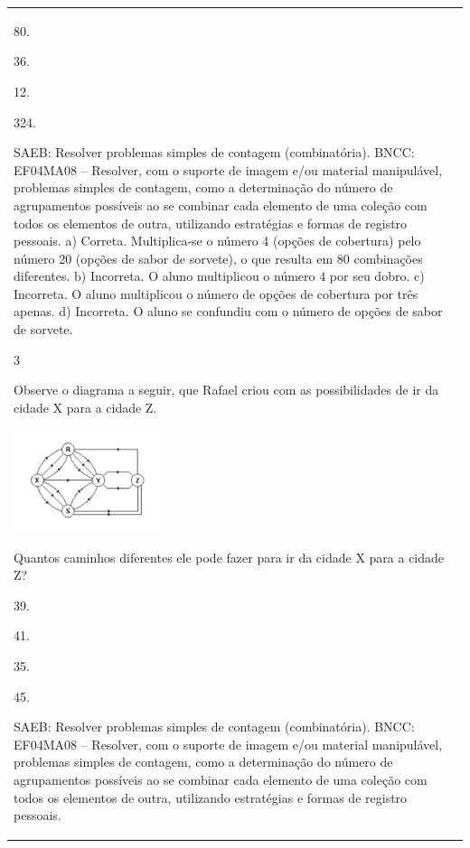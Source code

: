 \begin{mdframed}[linewidth=2pt,linecolor=salmao,roundcorner=2pt]
\begin{escolha}
{{{\begin{longtable}[]{@{}l@{}}
\begin{itemize}
{\begin{escolha}
\item
  80.
\item
  36.
\item
  12.
\item
  324.
\end{escolha}

SAEB: Resolver problemas simples de contagem (combinatória).
BNCC: EF04MA08 -- Resolver, com o suporte de imagem e/ou material manipulável, problemas simples
de contagem, como a determinação do número de agrupamentos possíveis ao se combinar cada
elemento de uma coleção com todos os elementos de outra, utilizando estratégias e formas de
registro pessoais.
a) Correta. Multiplica-se o número 4 (opções de cobertura) pelo número 20 (opções de sabor de sorvete), o que resulta em 80 combinações diferentes.
b) Incorreta. O aluno multiplicou o número 4 por seu dobro.
c) Incorreta. O aluno multiplicou o número de opções de cobertura por três apenas.
d) Incorreta. O aluno se confundiu com o número de opções de sabor de sorvete.

\num{3}

Observe o diagrama a seguir, que Rafael criou com as possibilidades de ir
da cidade X para a cidade Z.


\includegraphics[width=1.68348in,height=1.18344in]{media/image141.png}

Quantos caminhos diferentes ele pode fazer para ir da cidade X para a
cidade Z?

\begin{escolha}
\item
  39.
\item
  41.
\item
  35.
\item
  45.
\end{escolha}

SAEB: Resolver problemas simples de contagem (combinatória).
BNCC: EF04MA08 -- Resolver, com o suporte de imagem e/ou material manipulável, problemas simples
de contagem, como a determinação do número de agrupamentos possíveis ao se combinar cada
elemento de uma coleção com todos os elementos de outra, utilizando estratégias e formas de
registro pessoais.

}
\end{itemize}
\end{longtable}}}}
\end{escolha}
\end{mdframed}

